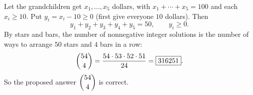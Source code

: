Let the grandchildren get $x_1,\dots,x_5$ dollars, with $x_1+\cdots+x_5=100$ and each $x_i\ge10$. Put $y_i=x_i-10\ge0$ (first give everyone $10$ dollars). Then
\[y_1+y_2+y_3+y_4+y_5=50,\qquad y_i\ge0.\]
By stars and bars, the number of nonnegative integer solutions is the number of ways to arrange $50$ stars and $4$ bars in a row:
\[\dbinom{54}{4}=\dfrac{54\cdot53\cdot52\cdot51}{24}=\boxed{316251}.\]
So the proposed answer $\dbinom{54}{4}$ is correct.
